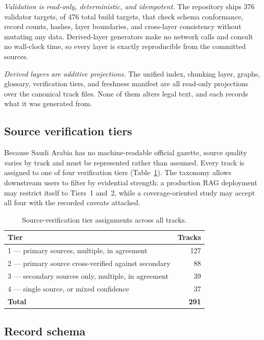 \documentclass[sn-basic]{sn-jnl}%
\begin{document}
\emph{Validation is read-only, deterministic, and idempotent.} The
repository ships 376 validator targets, of 476 total build targets, that
check schema conformance, record counts, hashes, layer boundaries, and
cross-layer consistency without mutating any data. Derived-layer generators
make no network calls and consult no wall-clock time, so every layer is
exactly reproducible from the committed sources.

\emph{Derived layers are additive projections.} The unified index, chunking
layer, graphs, glossary, verification tiers, and freshness manifest are all
read-only projections over the canonical track files. None of them alters
legal text, and each records what it was generated from.

\subsection{Source verification tiers}

Because Saudi Arabia has no machine-readable official gazette, source
quality varies by track and must be represented rather than assumed. Every
track is assigned to one of four verification tiers
(Table~\ref{tab:tiers}). The taxonomy allows downstream users to filter by
evidential strength: a production RAG deployment may restrict itself to
Tiers~1 and~2, while a coverage-oriented study may accept all four with the
recorded caveats attached.

\begin{table}[t]
\centering
\small
\begin{tabular}{lr}
\toprule
\textbf{Tier} & \textbf{Tracks} \\
\midrule
1 --- primary sources, multiple, in agreement & 127 \\
2 --- primary source cross-verified against secondary & 88 \\
3 --- secondary sources only, multiple, in agreement & 39 \\
4 --- single source, or mixed confidence & 37 \\
\midrule
\textbf{Total} & \textbf{291} \\
\bottomrule
\end{tabular}
\caption{Source-verification tier assignments across all tracks.}
\label{tab:tiers}
\end{table}

\subsection{Record schema}
\end{document}
